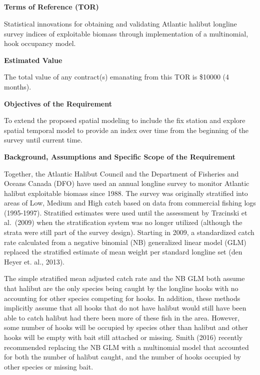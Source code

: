 \documentclass[12pt]{article}\usepackage[]{graphicx}\usepackage[]{color}
\begin{document}
\begin{appendices}

\clearpage

\section{}
\label{app:first-appendix}


\centering

\textbf{Terms of Reference (TOR)} \flushleft

Statistical innovations for obtaining and validating Atlantic halibut longline survey indices of exploitable biomass through implementation of a multinomial, hook occupancy model.

\textbf{Estimated Value}

The total value of any contract(s) emanating from this TOR is \$10000 (4 months).

\textbf{Objectives of the Requirement}

To extend the proposed spatial modeling to include the fix station and explore spatial temporal model to provide an index over time from the beginning of the survey until current time.

\textbf{Background, Assumptions and Specific Scope of the Requirement}

Together, the Atlantic Halibut Council and the Department of Fisheries and Oceans Canada (DFO) have used an annual longline survey to monitor Atlantic halibut exploitable biomass since 1988. The survey was originally stratified into areas of Low, Medium and High catch based on data from commercial fishing logs (1995-1997). Stratified estimates were used until the assessment by Trzcinski et al.~(2009) when the stratification system was no longer utilized (although the strata were still part of the survey design). Starting in 2009, a standardized catch rate calculated from a negative binomial (NB) generalized linear model (GLM) replaced the stratified estimate of mean weight per standard longline set (den Heyer et. al., 2013).

The simple stratified mean adjusted catch rate and the NB GLM both assume that halibut are the only species being caught by the longline hooks with no accounting for other species competing for hooks. In addition, these methods implicitly assume that all hooks that do not have halibut would still have been able to catch halibut had there been more of these fish in the area. However, some number of hooks will be occupied by species other than halibut and other hooks will be empty with bait still attached or missing. Smith (2016) recently recommended replacing the NB GLM with a multinomial model that accounted for both the number of halibut caught, and the number of hooks occupied by other species or missing bait.


\end{appendices}
\end{document}
